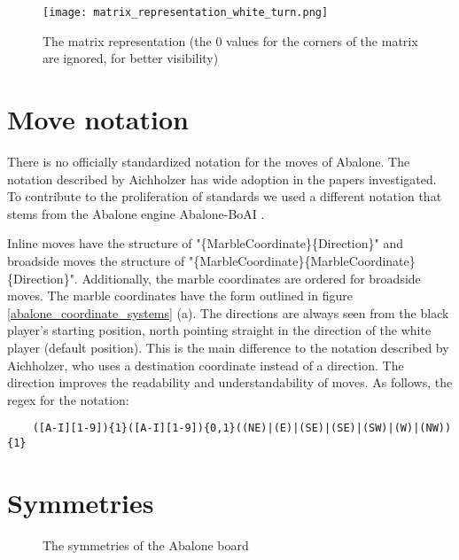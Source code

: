 \begin{figure}[!h]
    \centering
    \texttt{[image: matrix\_representation\_white\_turn.png]}
    \caption{The matrix representation (the $0$ values for the corners of the matrix are ignored, for better visibility)}
    \label{abalone_matrix_representation}
\end{figure}

\section{Move notation}
\label{abalone_move_notation}
There is no officially standardized notation for the moves of Abalone. The notation described by Aichholzer \cite{aichholzer_abalone_2006} has wide adoption in the papers investigated. To contribute to the proliferation of standards \cite{xkcd_standards_nodate} we used a different notation that stems from the Abalone engine Abalone-BoAI \cite{scriptim_scriptimabalone-boai_2021}.

Inline moves have the structure of "\{MarbleCoordinate\}\{Direction\}" and broadside moves the structure of "\{MarbleCoordinate\}\{MarbleCoordinate\}\{Direction\}". Additionally, the marble coordinates are ordered for broadside moves. The marble coordinates have the form outlined in figure \ref{abalone_coordinate_systems} (a). The directions are always seen from the black player's starting position, north pointing straight in the direction of the white player (default position). This is the main difference to the notation described by Aichholzer, who uses a destination coordinate instead of a direction. The direction improves the readability and understandability of moves. As follows, the regex for the notation:

\begin{BVerbatim}
    ([A-I][1-9]){1}([A-I][1-9]){0,1}((NE)|(E)|(SE)|(SE)|(SW)|(W)|(NW)){1}
\end{BVerbatim}

\section{Symmetries}
\label{abalone_symmetries}

\begin{figure}
    \centering
    \caption{The symmetries of the Abalone board}
    \label{abalone_symmetries_figure}
\end{figure}

